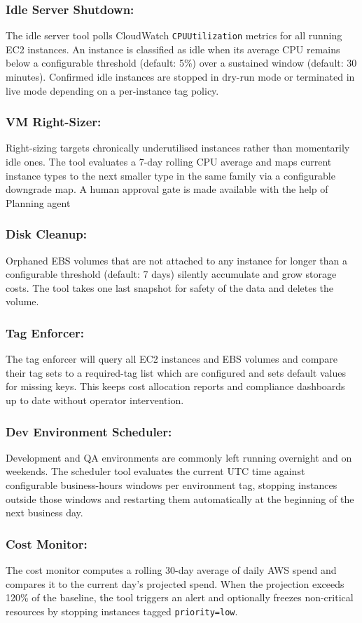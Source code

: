 \documentclass{ieeeaccess}
\begin{document}
\begin{enumerate}
  \subsubsection{Idle Server Shutdown:}
The idle server tool polls CloudWatch \texttt{CPUUtilization} metrics for all
running EC2 instances. An instance is classified as idle when its average CPU
remains below a configurable threshold (default: 5\%) over a sustained window
(default: 30 minutes). Confirmed idle instances are stopped in dry-run mode
or terminated in live mode depending on a per-instance tag policy.

\subsubsection{VM Right-Sizer:}
Right-sizing targets chronically underutilised instances rather than
momentarily idle ones. The tool evaluates a 7-day rolling CPU average and
maps current instance types to the next smaller type in the same family via a
configurable downgrade map. A human approval gate is made  available with the help of  Planning agent

\subsubsection{Disk Cleanup:}
Orphaned EBS volumes that are not attached to any instance for longer than a configurable threshold (default: 7 days) silently accumulate and grow storage costs. The tool takes one last snapshot for safety of the data and deletes the volume.


\subsubsection{Tag Enforcer:}
The tag enforcer will query all EC2 instances and EBS volumes and compare their tag sets to a required-tag list which are configured and sets default values for missing keys. This keeps cost allocation reports and compliance dashboards up to date without operator intervention.

\subsubsection{Dev Environment Scheduler:}
Development and QA environments are commonly left running overnight and on
weekends. The scheduler tool evaluates the current UTC time against
configurable business-hours windows per environment tag, stopping instances
outside those windows and restarting them automatically at the beginning of
the next business day.


\subsubsection{Cost Monitor:}
The cost monitor computes a rolling 30-day average of daily AWS spend and
compares it to the current day's projected spend. When the projection exceeds
120\% of the baseline, the tool triggers an alert and optionally freezes
non-critical resources by stopping instances tagged \texttt{priority=low}.
\end{enumerate}
\end{document}
